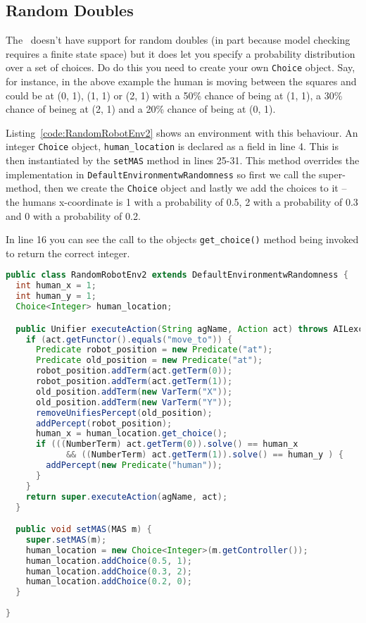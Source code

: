 \documentclass[a4]{article}
\begin{document}
\subsection{Random Doubles}
The \ail\ doesn't have support for random doubles (in part because model checking requires a finite state space) but it does let you specify a probability distribution over a set of choices.  Do do this you need to create your own \texttt{Choice} object.  Say, for instance, in the above example the human is moving between the squares and could be at (0, 1), (1, 1) or (2, 1) with a 50\% chance of being at (1, 1), a 30\% chance of beineg at (2, 1) and a 20\% chance of being at (0, 1).

Listing~\ref{code:RandomRobotEnv2} shows an environment with this behaviour.  An integer \texttt{Choice} object, \texttt{human\_location} is declared as a field in line 4.  This is then instantiated by the \texttt{setMAS} method in lines 25-31.  This method overrides the implementation in \texttt{DefaultEnvironmentwRandomness} so first we call the super-method, then we create the \texttt{Choice} object and lastly we add the choices to it -- the humans x-coordinate is 1 with a probability of 0.5, 2 with a probability of 0.3 and 0 with a probability of 0.2.

In line 16 you can see the call to the objects \texttt{get\_choice()} method being invoked to return the correct integer.
\begin{lstlisting}[float,caption=RandomRobotEnv2,basicstyle=\sffamily,language=Java,style=easslisting,label=code:RandomRobotEnv2]
public class RandomRobotEnv2 extends DefaultEnvironmentwRandomness {
  int human_x = 1;
  int human_y = 1;
  Choice<Integer> human_location;

  public Unifier executeAction(String agName, Action act) throws AILexception {
    if (act.getFunctor().equals("move_to")) {
      Predicate robot_position = new Predicate("at");
      Predicate old_position = new Predicate("at");
      robot_position.addTerm(act.getTerm(0));
      robot_position.addTerm(act.getTerm(1));
      old_position.addTerm(new VarTerm("X"));
      old_position.addTerm(new VarTerm("Y"));
      removeUnifiesPercept(old_position);
      addPercept(robot_position);
      human_x = human_location.get_choice();
      if (((NumberTerm) act.getTerm(0)).solve() == human_x 
            && ((NumberTerm) act.getTerm(1)).solve() == human_y ) {
        addPercept(new Predicate("human"));
      }
    }
    return super.executeAction(agName, act);
  }

  public void setMAS(MAS m) {
    super.setMAS(m);
    human_location = new Choice<Integer>(m.getController());
    human_location.addChoice(0.5, 1);
    human_location.addChoice(0.3, 2);
    human_location.addChoice(0.2, 0);
  }
	      
}
\end{lstlisting}
\end{document}
